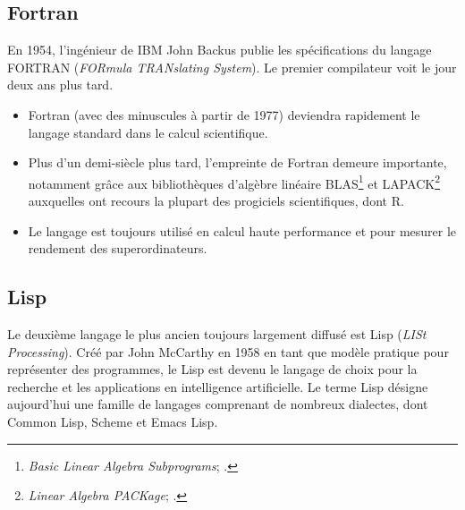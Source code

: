 \subsection{Fortran}
\label{sec:informatique:historique:fortran}

En 1954, l'ingénieur de IBM John Backus publie les spécifications du
langage FORTRAN (\emph{FORmula TRANslating System}). Le premier
compilateur voit le jour deux ans plus tard.
\begin{itemize}
\item Fortran (avec des minuscules à partir de 1977) deviendra
  rapidement le langage standard dans le calcul scientifique.
\item Plus d'un demi-siècle plus tard, l'empreinte de Fortran demeure
  importante, notamment grâce aux bibliothèques d'algèbre linéaire
  BLAS\footnote{%
    \emph{Basic Linear Algebra Subprograms};
    .} %
  et LAPACK\footnote{%
    \emph{Linear Algebra PACKage};
    .} %
  auxquelles ont recours la plupart des progiciels scientifiques, dont
  R.
\item Le langage est toujours utilisé en calcul haute performance et
  pour mesurer le rendement des superordinateurs.
\end{itemize}

\begin{figure}[t]
\end{figure}

\subsection{Lisp}
\label{sec:informatique:historique:lisp}

Le deuxième langage le plus ancien toujours largement diffusé est Lisp
(\emph{LISt Processing}). Créé par John McCarthy en 1958 en tant que
modèle pratique pour représenter des programmes, le Lisp est devenu le
langage de choix pour la recherche et les applications en intelligence
artificielle. Le terme Lisp désigne aujourd'hui une famille de
langages comprenant de nombreux dialectes, dont Common Lisp, Scheme et
Emacs Lisp.

